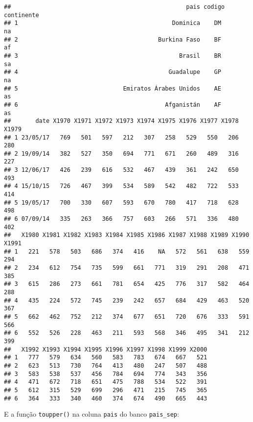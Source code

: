 \documentclass[]{book}
\newenvironment{Shaded}{\begin{snugshade}}{\end{snugshade}}
\newcommand{\KeywordTok}[1]{\textcolor[rgb]{0.13,0.29,0.53}{\textbf{#1}}}
\newcommand{\NormalTok}[1]{#1}
\newcommand{\OperatorTok}[1]{\textcolor[rgb]{0.81,0.36,0.00}{\textbf{#1}}}
\newcommand{\StringTok}[1]{\textcolor[rgb]{0.31,0.60,0.02}{#1}}
\theoremstyle{definition}
\theoremstyle{definition}
\theoremstyle{definition}
\theoremstyle{remark}
\begin{document}
\begin{verbatim}
##                                                  pais codigo continente
## 1                                            Dominica    DM          na
## 2                                        Burkina Faso    BF          af
## 3                                              Brasil    BR          sa
## 4                                           Guadalupe    GP          na
## 5                              Emiratos Árabes Unidos    AE          as
## 6                                          Afganistán    AF          as
##       date X1970 X1971 X1972 X1973 X1974 X1975 X1976 X1977 X1978 X1979
## 1 23/05/17   769   501   597   212   307   258   529   550   206   280
## 2 19/09/14   382   527   350   694   771   671   260   489   316   227
## 3 12/06/17   426   239   616   532   467   439   361   242   650   493
## 4 15/10/15   726   467   399   534   589   542   482   722   533   414
## 5 19/05/17   700   330   607   593   670   780   417   718   628   498
## 6 07/09/14   335   263   366   757   603   266   571   336   480   402
##   X1980 X1981 X1982 X1983 X1984 X1985 X1986 X1987 X1988 X1989 X1990 X1991
## 1   221   578   503   686   374   416    NA   572   561   638   559   294
## 2   234   612   754   735   599   661   771   319   291   208   471   385
## 3   615   286   273   661   781   654   425   776   317   582   464   288
## 4   435   224   572   745   239   242   657   684   429   463   520   367
## 5   662   462   752   212   374   677   651   720   676   333   591   566
## 6   552   526   228   463   211   593   568   346   495   341   212   399
##   X1992 X1993 X1994 X1995 X1996 X1997 X1998 X1999 X2000
## 1   777   579   634   560   583   783   674   667   521
## 2   623   513   730   764   413   480   247   507   488
## 3   583   538   537   456   784   694   774   343   356
## 4   471   672   718   651   475   788   534   522   391
## 5   612   315   529   699   296   471   215   745   365
## 6   364   333   340   460   374   674   490   665   443
\end{verbatim}

E a função \texttt{toupper()} na coluna \texttt{pais} do banco \texttt{pais\_sep}:

\begin{Shaded}
\end{Shaded}
\end{document}
